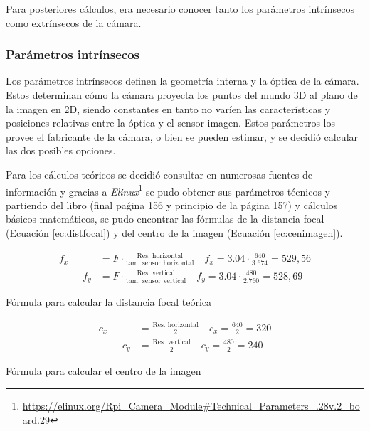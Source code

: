 Para posteriores cálculos, era necesario conocer tanto los parámetros intrínsecos como extrínsecos de la cámara.  

\subsubsection{Parámetros intrínsecos}
\label{subsubsec:intrinsecoscamara}

Los parámetros intrínsecos definen la geometría interna y la óptica de la cámara. Estos determinan cómo la cámara proyecta los puntos del mundo 3D al plano de la imagen en 2D, siendo constantes en tanto no varíen las características y posiciones relativas entre la óptica y el sensor imagen. Estos parámetros los provee el fabricante de la cámara, o bien se pueden estimar, y se decidió calcular las dos posibles opciones.

Para los cálculos teóricos se decidió consultar en numerosas fuentes de información y gracias a \textit{Elinux}\footnote{\url{https://elinux.org/Rpi_Camera_Module\#Technical_Parameters_.28v.2_board.29}} se pudo obtener sus parámetros técnicos y partiendo del libro \cite{Hartley2004} (final paǵina 156 y principio de la página 157) y cálculos básicos matemáticos, se pudo encontrar las fórmulas de la distancia focal (Ecuación \ref{ec:distfocal}) y del centro de la imagen (Ecuación \ref{ec:cenimagen}).


\begin{myequation}[h]
	\begin{align}
		f_x &= F \cdot \frac{\text{Res. horizontal}}{\text{tam. sensor horizontal}} \quad
		f_x = 3.04 \cdot \frac{640}{3.674} = 529,56 \\
		\hspace{1cm}
		f_y &= F \cdot \frac{\text{Res. vertical}}{\text{tam. sensor vertical}} \quad
		f_y = 3.04 \cdot \frac{480}{2.760} = 528,69
	\end{align}
	\caption[Fórmula para calcular la distancia focal teórica]{Fórmula para calcular la distancia focal teórica}
	\label{ec:distfocal}
\end{myequation}

\begin{myequation}[h]
	\begin{align}
		c_x &= \frac{\text{Res. horizontal}}{2} \quad
		c_x = \frac{640}{2} = 320 \\
		\hspace{1cm}
		c_y &= \frac{\text{Res. vertical}}{2} \quad
		c_y =  \frac{480}{2} = 240
	\end{align}
	\caption[Fórmula para calcular el centro de la imagen]{Fórmula para calcular el centro de la imagen}
	\label{ec:cenimagen}
\end{myequation}


